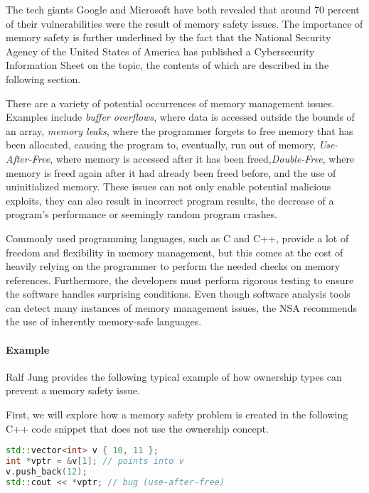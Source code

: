 \documentclass[sigplan,11pt,nonacm]{acmart}
\begin{document}
The tech giants Google \cite{google-memory-safety} and Microsoft \cite{microsoft-memory-safety} have both revealed that around 70 percent of their vulnerabilities were the result of memory safety issues.
The importance of memory safety is further underlined by the fact that the National Security Agency of the United States of America has published a Cybersecurity Information Sheet \cite{nsa-memory-safety} on the topic, the contents of which are described in the following section.

There are a variety of potential occurrences of memory management issues.
Examples include \emph{buffer overflows}, where data is accessed outside the bounds of an array, \emph{memory leaks}, where the programmer forgets to free memory that has been allocated, causing the program to, eventually, run out of memory, \emph{Use-After-Free}, where memory is accessed after it has been freed,\emph{Double-Free}, where memory is freed again after it had already been freed before, and the use of uninitialized memory.
These issues can not only enable potential malicious exploits, they can also result in incorrect program results, the decrease of a program's performance or seemingly random program crashes.

Commonly used programming languages, such as C and C++, provide a lot of freedom and flexibility in memory management, but this comes at the cost of heavily relying on the programmer to perform the needed checks on memory references.
Furthermore, the developers must perform rigorous testing to ensure the software handles surprising conditions.
Even though software analysis tools can detect many instances of memory management issues, the NSA recommends the use of inherently memory-safe languages.


\paragraph{Example}

Ralf Jung \cite{understanding-evolving-rust} provides the following typical example of how ownership types can prevent a memory safety issue.

First, we will explore how a memory safety problem is created in the following C++ code snippet that does not use the ownership concept.

\begin{lstlisting}[language=C++]
std::vector<int> v { 10, 11 };
int *vptr = &v[1]; // points into v
v.push_back(12);
std::cout << *vptr; // bug (use-after-free)
\end{lstlisting}
\end{document}
